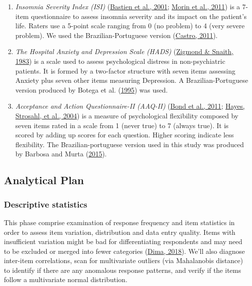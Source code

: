 \documentclass[
  ,doc,11pt, twoside,floatsintext]{apa6}
\begin{document}
\begin{enumerate}
\def\labelenumi{\arabic{enumi}.}
\item
  \emph{Insomnia Severity Index (ISI)} (\protect\hyperlink{ref-bastien2001}{Bastien et al., 2001}; \protect\hyperlink{ref-morin2011a}{Morin et al., 2011}) is a 7-item questionnaire to assess insomnia severity and its impact on the patient's life. Raters use a 5-point scale ranging from 0 (no problem) to 4 (very severe problem). We used the Brazilian-Portuguese version (\protect\hyperlink{ref-castro}{Castro, 2011}).
\item
  \emph{The Hospital Anxiety and Depression Scale (HADS)} (\protect\hyperlink{ref-zigmond1983hospital}{Zigmond \& Snaith, 1983}) is a scale used to assess psychological distress in non-psychiatric patients. It is formed by a two-factor structure with seven items assessing Anxiety plus seven other items measuring Depression. A Brazilian-Portuguese version produced by Botega et al. (\protect\hyperlink{ref-botega1995transtornos}{1995}) was used.
\item
  \emph{Acceptance and Action Questionnaire-II (AAQ-II)} (\protect\hyperlink{ref-bond2011preliminary}{Bond et al., 2011}; \protect\hyperlink{ref-hayes2004measuring}{Hayes, Strosahl, et al., 2004}) is a measure of psychological flexibility composed by seven items rated in a scale from 1 (never true) to 7 (always true). It is scored by adding up scores for each question. Higher scoring indicate less flexibility. The Brazilian-portuguese version used in this study was produced by Barbosa and Murta (\protect\hyperlink{ref-barbosa2015propriedades}{2015}).
\end{enumerate}

\hypertarget{analytical-plan}{%
\subsection{Analytical Plan}\label{analytical-plan}}

\hypertarget{descriptive-statistics}{%
\subsubsection{Descriptive statistics}\label{descriptive-statistics}}

This phase comprise examination of response frequency and item statistics in order to assess item variation, distribution and data entry quality. Items with insufficient variation might be bad for differentiating respondents and may need to be excluded or merged into fewer categories (\protect\hyperlink{ref-dima2018}{Dima, 2018}). We'll also diagnose inter-item correlations, scan for multivariate outliers (via Mahalanobis distance) to identify if there are any anomalous response patterns, and verify if the items follow a multivariate normal distribution.
\end{document}
